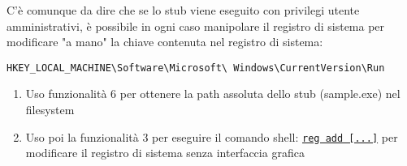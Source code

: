 \documentclass[
    a4paper, %
    11pt %
]{article}
\begin{document}
        C'è comunque da dire che se lo stub viene eseguito con privilegi utente amministrativi, è
        possibile in ogni caso manipolare il registro di sistema per modificare "a mano" la chiave contenuta 
        nel registro di sistema:
        
        \texttt{HKEY\_LOCAL\_MACHINE\textbackslash Software\textbackslash Microsoft\textbackslash 
        Windows\textbackslash CurrentVersion\textbackslash Run}

        \begin{enumerate}
            \item Uso funzionalità 6 per ottenere la path assoluta dello stub (sample.exe) nel filesystem
            \item Uso poi la funzionalità 3 per eseguire il comando shell: \href{https://learn.microsoft.com/it-it/windows-server/administration/windows-commands/reg-add}{\texttt{reg add [...]}} per 
            modificare il registro di sistema senza interfaccia grafica
        \end{enumerate}
        
\end{document}
